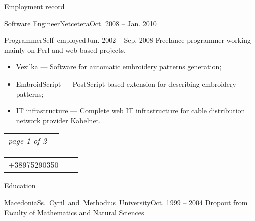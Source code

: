 \documentclass[]{mcdowellcv}
\begin{document}
\begin{cvsection}{Employment record}
\begin{cvsubsection}{Software Engineer}{Netcetera}{Oct. 2008 -- Jan. 2010}
\begin{itemize}
            \end{itemize}
        \end{cvsubsection}
        \begin{cvsubsection}{Programmer}{Self--employed}{Jun. 2002 -- Sep. 2008}
            Freelance programmer working mainly on Perl and web based projects.
            \begin{itemize}
                \item Vezilka --- Software for automatic embroidery patterns generation;
                \item EmbroidScript --- PostScript based extension for describing embroidery patterns;
                \item IT infrastructure --- Complete web IT infrastructure for cable distribution network provider Kabelnet.
            \end{itemize}
        \end{cvsubsection}
    \end{cvsection}

    \vfill
    \begin{tabu} to 1\textwidth { X[l,m] X[r,m] }
        \textit{page 1 of 2}
    \end{tabu}
    \clearpage

    \begin{center}
        \begin{tabu} to 1\textwidth { X[l,m] X[2,c,m] X[r,m] }
            \small{+38975290350} &
            \textbf{\Large{}} &
            \small{} \linebreak
        \end{tabu}
    \end{center}
    \vspace*{20pt}

    \begin{cvsection}{Education}
    \label{Education}
        \begin{cvsubsection}{Macedonia}{\mbox{Ss. Cyril and Methodius University}}{Oct. 1999 -- 2004}
            Dropout from Faculty of Mathematics and Natural Sciences
        \end{cvsubsection}
    \end{cvsection}
\end{document}
